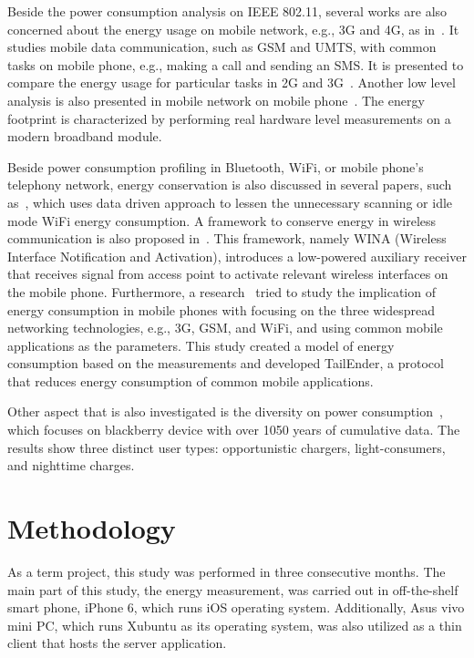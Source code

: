 \documentclass[journal]{vgtc}                %
\begin{document}
Beside the power consumption analysis on IEEE 802.11, several works are also concerned about the energy usage on mobile network, e.g., 3G and 4G, as in~\cite{Perrucci2009}. It studies mobile data communication, such as GSM and UMTS, with common tasks on mobile phone, e.g., making a call and sending an SMS. It is presented to compare the energy usage for particular tasks in 2G and 3G~\cite{Perrucci2009}. Another low level analysis is also presented in mobile network on mobile phone~\cite{Vergara2012}. The energy footprint is characterized by performing real hardware level measurements on a modern broadband module.

Beside power consumption profiling in Bluetooth, WiFi, or mobile phone's telephony network, energy conservation is also discussed in several papers, such as~\cite{Bandara2015}, which uses data driven approach to lessen the unnecessary scanning or idle mode WiFi energy consumption. A framework to conserve energy in wireless communication is also proposed in~\cite{Chareen2011}. This framework, namely WINA (Wireless Interface Notification and Activation), introduces a low-powered auxiliary receiver that receives signal from access point to activate relevant wireless interfaces on the mobile phone. Furthermore, a research~\cite{Balasubramanian2009} tried to study the implication of energy consumption in mobile phones with focusing on the three widespread networking technologies, e.g., 3G, GSM, and WiFi, and using common mobile applications as the parameters. This study created a model of energy consumption based on the measurements and developed TailEnder, a protocol that reduces energy consumption of common mobile applications.

Other aspect that is also investigated is the diversity on power consumption~\cite{Oliver2010}, which focuses on blackberry device with over 1050 years of cumulative data. The results show three distinct user types: opportunistic chargers, light-consumers, and nighttime charges.

\section{Methodology} %
\label{sec:methodology}
As a term project, this study was performed in three consecutive months. The main part of this study, the energy measurement, was carried out in off-the-shelf smart phone, iPhone 6, which runs iOS operating system. Additionally, Asus vivo mini PC, which runs Xubuntu as its operating system, was also utilized as a thin client that hosts the server application.
\end{document}
